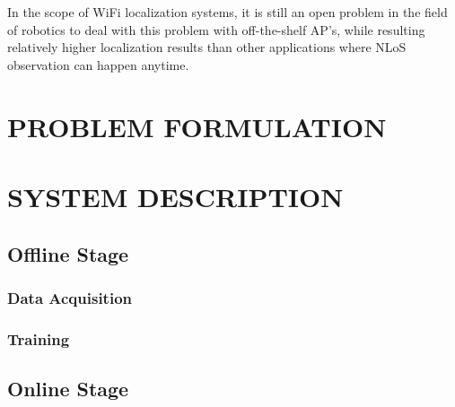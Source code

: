 \documentclass[letterpaper, 10 pt, conference]{ieeeconf}  %
\newcommand{\lorem}{
}
\begin{document}

    In the scope of WiFi localization systems, it is still an open problem in the field of robotics to deal with this problem with off-the-shelf AP's, while resulting relatively higher localization results than other applications where NLoS observation can happen anytime.




\section{\label{sec-PF}PROBLEM FORMULATION}
  \lorem{}
\section{\label{sec-SD}SYSTEM DESCRIPTION}
  \subsection{Offline Stage}

    \subsubsection{Data Acquisition}

    \subsubsection{Training}

  \subsection{Online Stage}
\end{document}
